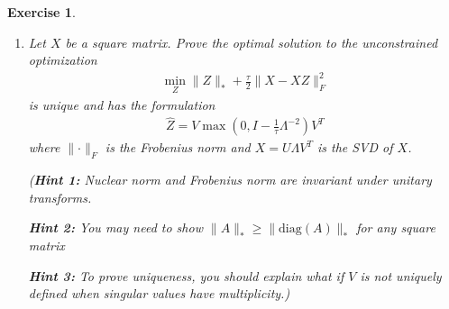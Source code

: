 \documentclass[12pt]{article}
\theoremstyle{colon}
\newtheorem{exercise}{Exercise}
\begin{document}
\begin{exercise}
\begin{enumerate}[label=\arabic*)]
    \item Let $X$ be a square matrix. Prove the optimal solution to the unconstrained optimization
      \begin{gather*}
        \min_Z \lVert Z \rVert_* + \frac{\tau}{2} \lVert X - X Z \rVert_F^2
      \end{gather*}
      is unique and has the formulation
      \begin{gather*}
        \widehat{Z} = V \max \left( 0, I - \frac{1}{\tau} \Lambda^{-2} \right) V^T
      \end{gather*}
      where $\lVert \cdot \rVert_F$ is the Frobenius norm and $X = U \Lambda V^T$ is the SVD of $X$.

      (\textbf{Hint 1:} Nuclear norm and Frobenius norm are invariant under unitary transforms.

      \textbf{Hint 2:} You may need to show $\lVert A \rVert_* \geq \lVert \text{diag}(A) \rVert_*$ for any square matrix

      \textbf{Hint 3:} To prove uniqueness, you should explain what if $V$ is not uniquely defined when singular values have multiplicity.)
  \end{enumerate}
\end{exercise}
\end{document}
